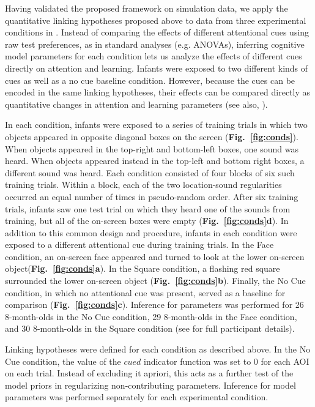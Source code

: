 \documentclass[12pt]{article}
\begin{document}
	Having validated the proposed framework on simulation data, we apply the quantitative linking hypotheses proposed above to data from three experimental conditions in \cite{Wu2010a}. Instead of comparing the effects of different attentional cues using raw test preferences, as in standard analyses (e.g. ANOVAs), inferring cognitive model parameters for each condition lets us analyze the effects of different cues directly on attention and learning. Infants were exposed to two different kinds of cues as well as a no cue baseline condition. However, because the cues can be encoded in the same linking hypotheses, their effects can be compared directly as quantitative changes in attention and learning parameters (see also, \cite{Donkin2012}).

	In each condition, infants were exposed to a series of training trials in which two objects appeared in opposite diagonal boxes on the screen (\textbf{Fig.~\ref{fig:conds}}). When objects appeared in the top-right and bottom-left boxes, one sound was heard. When objects appeared instead in the top-left and bottom right boxes, a different sound was heard. Each condition consisted of four blocks of six such training trials. Within a block, each of the two location-sound regularities occurred an equal number of times in pseudo-random order. After six training trials, infants saw one test trial on which they heard one of the sounds from training, but all of the on-screen boxes were empty (\textbf{Fig.~\ref{fig:conds}d}). In addition to this common design and procedure, infants in each condition were exposed to a different attentional cue during training trials. In the Face condition, an on-screen face appeared and turned to look at the lower on-screen object(\textbf{Fig.~\ref{fig:conds}a}). In the Square condition, a flashing red square surrounded the lower on-screen object (\textbf{Fig.~\ref{fig:conds}b}). Finally, the No Cue condition, in which no attentional cue was present, served as a baseline for comparison (\textbf{Fig.~\ref{fig:conds}c}). Inference for parameters was performed for 26 8-month-olds in the No Cue condition, 29 8-month-olds in the Face condition, and 30 8-month-olds in the Square condition (see \cite{Wu2010a} for full participant details).

	Linking hypotheses were defined for each condition as described above. In the No Cue condition, the value of the $cued$ indicator function was set to 0 for each AOI on each trial. Instead of excluding it apriori, this acts as a further test of the model priors in regularizing non-contributing parameters. Inference for model parameters was performed separately for each experimental condition.
\end{document}
